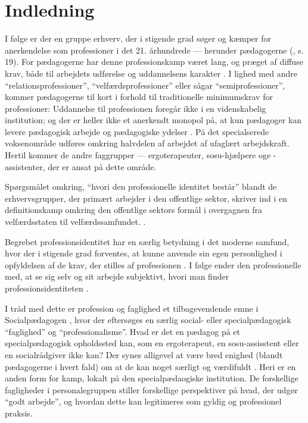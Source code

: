 \section{Indledning}

I følge \citeauthor{hansbolKonstruktionAfProfessionel2008} er der en gruppe erhverv, der i stigende grad søger og kæmper for anerkendelse som professioner i det 21. århundrede — herunder pædagogerne (\citeyear{hansbolKonstruktionAfProfessionel2008}, s. 19).
For pædagogerne har denne professionskamp været lang, og præget af diffuse krav, både til arbejdets udførelse og uddannelsens karakter \autocite[ss. 48-51] {kofodBornepolitikkenOgUdviklingen2007}.
I lighed med andre “relationsprofessioner”, “velfærdsprofessioner” eller sågar “semiprofessioner”, kommer pædagogerne til kort i forhold til traditionelle minimumskrav for professioner:
Uddannelse til professionen foregår ikke i en videnskabelig institution; og der er heller ikke et anerkendt monopol på, at kun pædagoger kan levere pædagogisk arbejde og pædagogiske ydelser \autocite[s.53]{kofodBornepolitikkenOgUdviklingen2007}.
På det specialserede voksenområde udføres omkring halvdelen af arbejdet af ufaglært arbejdskraft.
Hertil kommer de andre faggrupper — ergoterapeuter, sosu-hjælpere oge -assistenter, der er ansat på dette område.

Spørgsmålet omkring, “hvori den professionelle identitet består” blandt de erhvervsgrupper, der primært arbejder i den offentlige sektor, skriver \citeauthor{hansbolKonstruktionAfProfessionel2008} ind i en definitionskamp omkring den offentlige sektors formål i overgagnen fra velfærdsstaten til velfærdssamfundet.
\autocite[s. 19]{hansbolKonstruktionAfProfessionel2008}.

Begrebet professionsidentitet har en særlig betydning i det moderne samfund, hvor der i stigende grad forventes, at kunne anvende sin egen personlighed i opfyldelsen af de krav, der stilles af professionen \autocite{hansbolKonstruktionAfProfessionel2008}. I følge \citeauthor{mik-meyerIndledningSkabeProfessionel2012} ender den professionelle med, at se sig selv og sit arbejde subjektivt, hvori man finder professionsidentiteten \autocite[s. 458]{mik-meyerIndledningSkabeProfessionel2012}.

I tråd med dette er profession og faglighed et tilbagevendende emne i Socialpædagogen \autocite[fx]{petersenHvadSigerEksperten2019}, hvor der eftersøges en særlig social- eller specialpædagogisk “faglighed” og “professionalisme”.
Hvad er det en pædagog på et specialpædagogisk opholdssted kan, som en ergoterapeut, en sosu-assisstent eller en socialrådgiver ikke kan?
Der synes alligevel at være bred enighed (blandt pædagogerne i hvert fald) om at de kan noget særligt og værdifuldt \autocite{petersenSlagsMenneskeligAltmuligmand2019}.
Heri er en anden form for kamp, lokalt på den specialpædaogiske institution.
De forskellige fagligheder i personalegruppen stiller forskellige perspektiver på hvad, der udgør “godt arbejde”, og hvordan dette kan legitimeres som gyldig og professionel praksis.

